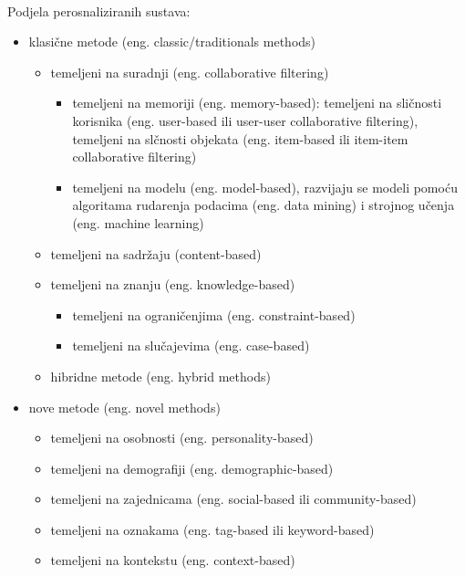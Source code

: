 \documentclass[a4paper,oneside,12pt]{memoir} %
\begin{document}
\bigskip
\\ Podjela perosnaliziranih sustava:
\begin{itemize}[topsep=2pt]
\setlength{\parskip}{0pt}
\item klasične metode (eng. classic/traditionals methods)
  \begin{itemize}[topsep=2pt]
  \setlength{\parskip}{0pt}
  \item temeljeni na suradnji (eng. collaborative filtering)
    \begin{itemize}[topsep=2pt]
    \setlength{\parskip}{0pt}
    \item temeljeni na memoriji (eng. memory-based): temeljeni na sličnosti korisnika (eng. user-based ili user-user collaborative filtering), temeljeni na slčnosti objekata (eng. item-based ili item-item collaborative filtering)
    \item temeljeni na modelu (eng. model-based), razvijaju se modeli pomoću algoritama rudarenja podacima (eng. data mining) i strojnog učenja (eng. machine learning)
    \end{itemize}
  \item temeljeni na sadržaju (content-based)
  \item temeljeni na znanju (eng. knowledge-based)
    \begin{itemize}[topsep=2pt]
	\setlength{\parskip}{0pt}
    \item temeljeni na ograničenjima (eng. constraint-based)
	\item temeljeni na slučajevima (eng. case-based)
	\end{itemize}
  \item hibridne metode (eng. hybrid methods)
  \end{itemize}
\item nove metode (eng. novel methods)
    \begin{itemize}[topsep=2pt]
	\setlength{\parskip}{0pt}
    \item temeljeni na osobnosti (eng. personality-based)
    \item temeljeni na demografiji (eng. demographic-based)
    \item temeljeni na zajednicama (eng. social-based ili community-based)
    \item temeljeni na oznakama (eng. tag-based ili keyword-based)
    \item temeljeni na kontekstu (eng. context-based)
	\end{itemize}
\end{itemize}
\bigskip
\end{document}
